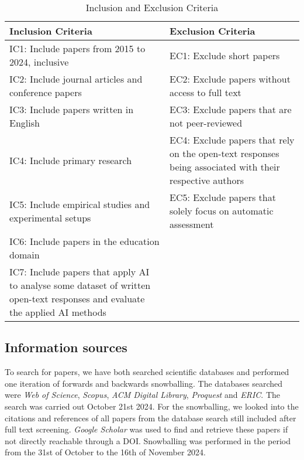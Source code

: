\begin{table}[h!]
\centering
\caption{Inclusion and Exclusion Criteria}
\label{tab:eligibilitycriteria}
\begin{tabularx}{\textwidth}{|X|X|}
\hline
\textbf{Inclusion Criteria} & \textbf{Exclusion Criteria} \\
\hline
IC1: Include papers from 2015 to 2024, inclusive & EC1: Exclude short papers \\
\hline
IC2: Include journal articles and conference papers & EC2: Exclude papers without access to full text \\
\hline
IC3: Include papers written in English & EC3: Exclude papers that are not peer-reviewed \\
\hline
IC4: Include primary research & EC4: Exclude papers that rely on the open-text responses being associated with their respective authors \\
\hline
IC5: Include empirical studies and experimental setups & EC5: Exclude papers that solely focus on automatic assessment \\
\hline
IC6: Include papers in the education domain & \\
\hline
IC7: Include papers that apply AI to analyse some dataset of written open-text responses and evaluate the applied AI methods & \\
\hline
\end{tabularx}
\end{table}

\subsection{Information sources}
To search for papers, we have both searched scientific databases and performed one iteration of forwards and backwards snowballing. The databases searched were \textit{Web of Science}, \textit{Scopus}, \textit{ACM Digital Library}, \textit{Proquest} and \textit{ERIC}. The search was carried out October 21st 2024. For the snowballing, we looked into the citations and references of all papers from the database search still included after full text screening. \textit{Google Scholar} was used to find and retrieve these papers if not directly reachable through a DOI. Snowballing was performed in the period from the 31st of October to the 16th of November 2024.


